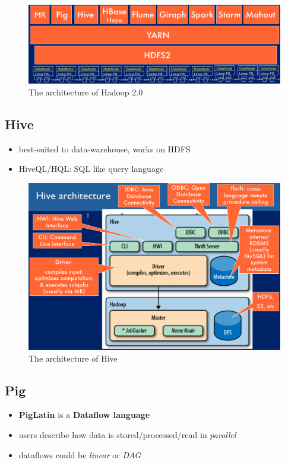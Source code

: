 \documentclass[a4paper]{article}
\begin{document}
\begin{multicols}{3}
\begin{figure}[H]
    \includegraphics[width=\linewidth]{HadoopV2.png}
    \caption{The architecture of Hadoop 2.0}
    \label{fig:hadoopv2}
\end{figure}

\subsection{Hive}
\begin{itemize}
    \item best-suited to data-warehouse, works on HDFS
    \item HiveQL/HQL: SQL like query language
\end{itemize}

\begin{figure}[H]
    \includegraphics[width=\linewidth]{HiveArchitecture.png}
    \caption{The architecture of Hive}
    \label{fig:hivearch}
\end{figure}

\subsection{Pig}
\begin{itemize}
    \item \textbf{PigLatin} is a \textbf{Dataflow language}
    \item users describe how data is stored/processed/read in \textit{parallel}
    \item dataflows could be \textit{linear} or \textit{DAG}
\end{itemize}


\end{multicols}
\end{document}
